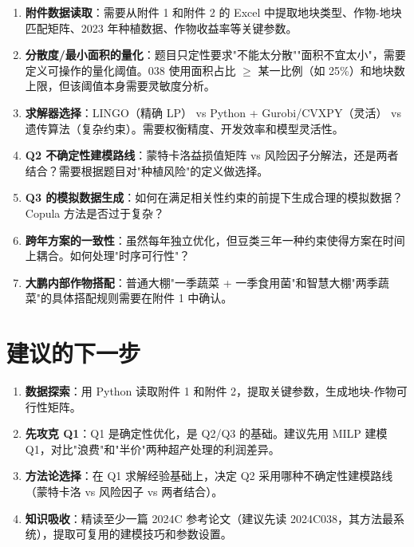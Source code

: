 \documentclass{internal-report}
\begin{document}
\begin{enumerate}
    \item \textbf{附件数据读取}：需要从附件 1 和附件 2 的 Excel 中提取地块类型、作物-地块匹配矩阵、2023 年种植数据、作物收益率等关键参数。
    
    \item \textbf{分散度/最小面积的量化}：题目只定性要求"不能太分散""面积不宜太小"，需要定义可操作的量化阈值。038 使用面积占比 $\geq$ 某一比例（如 25\%）和地块数上限，但该阈值本身需要灵敏度分析。
    
    \item \textbf{求解器选择}：LINGO（精确 LP） vs Python + Gurobi/CVXPY（灵活） vs 遗传算法（复杂约束）。需要权衡精度、开发效率和模型灵活性。
    
    \item \textbf{Q2 不确定性建模路线}：蒙特卡洛益损值矩阵 vs 风险因子分解法，还是两者结合？需要根据题目对"种植风险"的定义做选择。
    
    \item \textbf{Q3 的模拟数据生成}：如何在满足相关性约束的前提下生成合理的模拟数据？Copula 方法是否过于复杂？
    
    \item \textbf{跨年方案的一致性}：虽然每年独立优化，但豆类三年一种约束使得方案在时间上耦合。如何处理"时序可行性"？
    
    \item \textbf{大鹏内部作物搭配}：普通大棚"一季蔬菜 + 一季食用菌"和智慧大棚"两季蔬菜"的具体搭配规则需要在附件 1 中确认。
\end{enumerate}

\section{建议的下一步}

\begin{enumerate}
    \item \textbf{数据探索}：用 Python 读取附件 1 和附件 2，提取关键参数，生成地块-作物可行性矩阵。
    \item \textbf{先攻克 Q1}：Q1 是确定性优化，是 Q2/Q3 的基础。建议先用 MILP 建模 Q1，对比"浪费"和"半价"两种超产处理的利润差异。
    \item \textbf{方法论选择}：在 Q1 求解经验基础上，决定 Q2 采用哪种不确定性建模路线（蒙特卡洛 vs 风险因子 vs 两者结合）。
    \item \textbf{知识吸收}：精读至少一篇 2024C 参考论文（建议先读 2024C038，其方法最系统），提取可复用的建模技巧和参数设置。
\end{enumerate}
\end{document}
